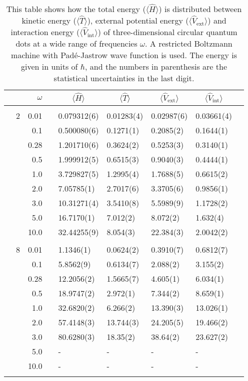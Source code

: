 \begin{table}[H]
	\caption{This table shows how the total energy ($\langle\hat{H}\rangle$) is distributed between kinetic energy ($\langle\hat{T}\rangle$), external potential energy ($\langle\hat{V}_{\text{ext}}\rangle$) and interaction energy ($\langle\hat{V}_{\text{int}}\rangle$) of three-dimensional circular quantum dots at a wide range of frequencies $\omega$. A restricted Boltzmann machine with Padé-Jastrow wave function is used. The energy is given in units of $\hbar$, and the numbers in parenthesis are the statistical uncertainties in the last digit.}
	\label{tab:splitfrequencyQDRBMPJ3D}
	\begin{tabularx}{\textwidth}{R{1cm}rrcR{2.3cm}R{2.3cm}R{2.3cm}R{2.3cm}R{1cm}} \hline\hline
		&\makecell{\\ \phantom{$N$} \\ \phantom{=}} & $\omega$ &&  &  &  &  & \\ \hline \\
		&2 & 0.01 && 0.079312(6) & 0.01283(4) & 0.02987(6) & 0.03661(4) \\
		&& 0.1 && 0.500080(6) & 0.1271(1) & 0.2085(2) & 0.1644(1) \\
		&& 0.28 && 1.201710(6) & 0.3624(2) & 0.5253(3) & 0.3140(1) \\
		&& 0.5 && 1.999912(5) & 0.6515(3) & 0.9040(3) & 0.4444(1) \\
		&& 1.0 && 3.729827(5) & 1.2995(4) & 1.7688(5) & 0.6615(2) \\
		&& 2.0 && 7.05785(1) & 2.7017(6) & 3.3705(6) & 0.9856(1) \\
		&& 3.0 && 10.31271(4) & 3.5410(8) & 5.5989(9) & 1.1728(2) \\ 
		&& 5.0 && 16.7170(1) & 7.012(2) & 8.072(2) & 1.632(4) \\
		&& 10.0 && 32.44255(9) & 8.054(3) & 22.384(3) & 2.0042(2) \\
		\hdashline \\
		
		&8 & 0.01 && 1.1346(1) & 0.0624(2) & 0.3910(7) & 0.6812(7) \\
		&& 0.1 && 5.8562(9) & 0.6134(7) & 2.088(2) & 3.155(2) \\
		&& 0.28 && 12.2056(2) & 1.5665(7) & 4.605(1) & 6.034(1) \\
		&& 0.5 && 18.9747(2) & 2.972(1) & 7.344(2) & 8.659(1) \\
		&& 1.0 && 32.6820(2) & 6.266(2) & 13.390(3) & 13.026(1) \\
		&& 2.0 && 57.4148(3) & 13.744(3) & 24.205(5) & 19.466(2) \\
		&& 3.0 && 80.6280(3) & 18.35(2) & 38.64(2) & 23.627(2) \\ 
		&& 5.0 && - & - & - & -\\
		&& 10.0 && - & - & - & -\\
		\hdashline \\
		

\end{tabularx}
\end{table}
